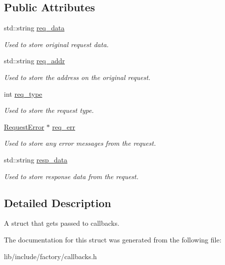 \subsection*{Public Attributes}
\begin{DoxyCompactItemize}
\item 
\hypertarget{structRequest_a23538a8fc246ee789a2461b00dcd6066}{std\-::string \hyperlink{structRequest_a23538a8fc246ee789a2461b00dcd6066}{req\-\_\-data}}\label{structRequest_a23538a8fc246ee789a2461b00dcd6066}

\begin{DoxyCompactList}\small\item\em Used to store original request data. \end{DoxyCompactList}\item 
\hypertarget{structRequest_a16c4515a69beddf526b19514a1de7ed5}{std\-::string \hyperlink{structRequest_a16c4515a69beddf526b19514a1de7ed5}{req\-\_\-addr}}\label{structRequest_a16c4515a69beddf526b19514a1de7ed5}

\begin{DoxyCompactList}\small\item\em Used to store the address on the original request. \end{DoxyCompactList}\item 
\hypertarget{structRequest_a15581550009936223e514df1a38db44e}{int \hyperlink{structRequest_a15581550009936223e514df1a38db44e}{req\-\_\-type}}\label{structRequest_a15581550009936223e514df1a38db44e}

\begin{DoxyCompactList}\small\item\em Used to store the request type. \end{DoxyCompactList}\item 
\hypertarget{structRequest_a9998a7dab5f0eeac6dd70d1f3bf529e3}{\hyperlink{structRequestError}{Request\-Error} $\ast$ \hyperlink{structRequest_a9998a7dab5f0eeac6dd70d1f3bf529e3}{req\-\_\-err}}\label{structRequest_a9998a7dab5f0eeac6dd70d1f3bf529e3}

\begin{DoxyCompactList}\small\item\em Used to store any error messages from the request. \end{DoxyCompactList}\item 
\hypertarget{structRequest_a396a206a5029d7cd8d8f34e1d33c027a}{std\-::string \hyperlink{structRequest_a396a206a5029d7cd8d8f34e1d33c027a}{resp\-\_\-data}}\label{structRequest_a396a206a5029d7cd8d8f34e1d33c027a}

\begin{DoxyCompactList}\small\item\em Used to store response data from the request. \end{DoxyCompactList}\end{DoxyCompactItemize}


\subsection{Detailed Description}
A struct that gets passed to callbacks. 

The documentation for this struct was generated from the following file\-:\begin{DoxyCompactItemize}
\item 
lib/include/factory/callbacks.\-h\end{DoxyCompactItemize}
